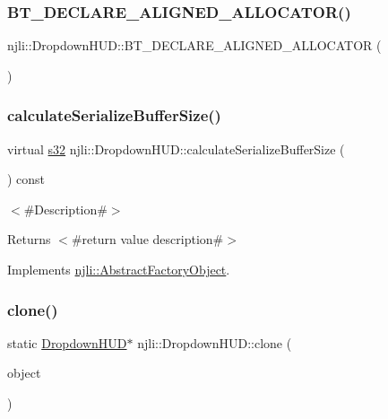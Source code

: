 \subsubsection{\texorpdfstring{B\+T\+\_\+\+D\+E\+C\+L\+A\+R\+E\+\_\+\+A\+L\+I\+G\+N\+E\+D\+\_\+\+A\+L\+L\+O\+C\+A\+T\+O\+R()}{BT\_DECLARE\_ALIGNED\_ALLOCATOR()}}
{\footnotesize\ttfamily njli\+::\+Dropdown\+H\+U\+D\+::\+B\+T\+\_\+\+D\+E\+C\+L\+A\+R\+E\+\_\+\+A\+L\+I\+G\+N\+E\+D\+\_\+\+A\+L\+L\+O\+C\+A\+T\+OR (\begin{DoxyParamCaption}{ }\end{DoxyParamCaption})\hspace{0.3cm}{\ttfamily [protected]}}

\mbox{\label{classnjli_1_1_dropdown_h_u_d_af8d949b42c2d39536ce2f5656b2c2532}} 
\subsubsection{\texorpdfstring{calculate\+Serialize\+Buffer\+Size()}{calculateSerializeBufferSize()}}
{\footnotesize\ttfamily virtual \mbox{\hyperlink{_util_8h_aa62c75d314a0d1f37f79c4b73b2292e2}{s32}} njli\+::\+Dropdown\+H\+U\+D\+::calculate\+Serialize\+Buffer\+Size (\begin{DoxyParamCaption}{ }\end{DoxyParamCaption}) const\hspace{0.3cm}{\ttfamily [virtual]}}

$<$\#\+Description\#$>$

\begin{DoxyReturn}{Returns}
$<$\#return value description\#$>$ 
\end{DoxyReturn}


Implements \mbox{\hyperlink{classnjli_1_1_abstract_factory_object_a4763d05bc9dc37c559111f8bb30e1dd8}{njli\+::\+Abstract\+Factory\+Object}}.

\mbox{\label{classnjli_1_1_dropdown_h_u_d_a3647fb8d0fb638143422fdb09a1dc28a}} 
\subsubsection{\texorpdfstring{clone()}{clone()}}
{\footnotesize\ttfamily static \mbox{\hyperlink{classnjli_1_1_dropdown_h_u_d}{Dropdown\+H\+UD}}$\ast$ njli\+::\+Dropdown\+H\+U\+D\+::clone (\begin{DoxyParamCaption}\item[{const \mbox{\hyperlink{classnjli_1_1_dropdown_h_u_d}{Dropdown\+H\+UD}} \&}]{object }\end{DoxyParamCaption})\hspace{0.3cm}{\ttfamily [static]}}

